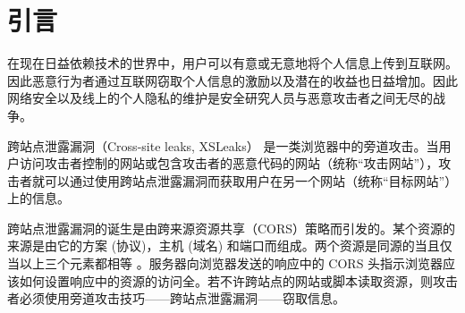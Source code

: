 \section{引言}

在现在日益依赖技术的世界中，用户可以有意或无意地将个人信息上传到互联网。因此恶意行为者通过互联网窃取个人信息的激励以及潜在的收益也日益增加。因此网络安全以及线上的个人隐私的维护是安全研究人员与恶意攻击者之间无尽的战争。

跨站点泄露漏洞（Cross-site leaks, XSLeaks）\cite{xsleaks} 是一类浏览器中的旁道攻击。当用户访问攻击者控制的网站或包含攻击者的恶意代码的网站（统称“攻击网站”），攻击者就可以通过使用跨站点泄露漏洞而获取用户在另一个网站（统称“目标网站”）上的信息。

跨站点泄露漏洞的诞生是由跨来源资源共享（CORS）策略而引发的。某个资源的来源是由它的方案 (协议)，主机 (域名) 和端口而组成。两个资源是同源的当且仅当以上三个元素都相等 \cite{origin}。服务器向浏览器发送的响应中的 CORS 头指示浏览器应该如何设置响应中的资源的访问全。若不许跨站点的网站或脚本读取资源，则攻击者必须使用旁道攻击技巧——跨站点泄露漏洞——窃取信息。